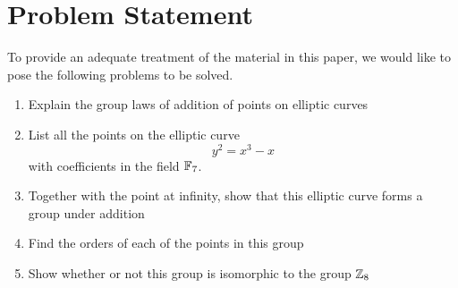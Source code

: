 \section{Problem Statement}

\hspace{10mm}To provide an adequate treatment of the material in this paper, we would like to pose the following problems to be solved.
\begin{enumerate}
    \item Explain the group laws of addition of points on elliptic curves
    \item List all the points on the elliptic curve
        \begin{equation*}
            y^2=x^3-x
        \end{equation*}
        with coefficients in the field $\mathbb{F}_7$. 
    \item Together with the point at infinity, show that this elliptic curve forms a group under addition
    \item Find the orders of each of the points in this group
    \item Show whether or not this group is isomorphic to the group $\mathbb{Z}_8$
\end{enumerate}